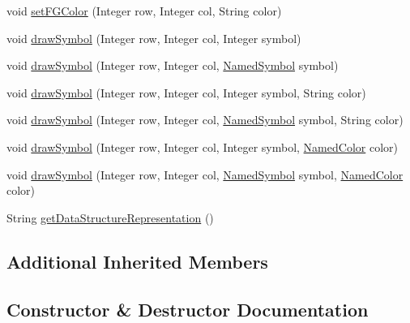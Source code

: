 \begin{DoxyCompactItemize}
\item 
void \mbox{\hyperlink{classbridges_1_1base_1_1_game_grid_a860f2669ba46bc7691f4bb5c7adf907b}{set\+F\+G\+Color}} (Integer row, Integer col, String color)
\item 
void \mbox{\hyperlink{classbridges_1_1base_1_1_game_grid_a8eee4918e2cbfc956a92a39252590114}{draw\+Symbol}} (Integer row, Integer col, Integer symbol)
\item 
void \mbox{\hyperlink{classbridges_1_1base_1_1_game_grid_a8e8f99d386149e9cd888dd9e6796e5e0}{draw\+Symbol}} (Integer row, Integer col, \mbox{\hyperlink{enumbridges_1_1base_1_1_named_symbol}{Named\+Symbol}} symbol)
\item 
void \mbox{\hyperlink{classbridges_1_1base_1_1_game_grid_a89a27cff9fd390f6d824b7e71534b256}{draw\+Symbol}} (Integer row, Integer col, Integer symbol, String color)
\item 
void \mbox{\hyperlink{classbridges_1_1base_1_1_game_grid_a998fd9e2a9a64e290c9edb01d49f324a}{draw\+Symbol}} (Integer row, Integer col, \mbox{\hyperlink{enumbridges_1_1base_1_1_named_symbol}{Named\+Symbol}} symbol, String color)
\item 
void \mbox{\hyperlink{classbridges_1_1base_1_1_game_grid_ad791794e65de113d96dbd173b34ae820}{draw\+Symbol}} (Integer row, Integer col, Integer symbol, \mbox{\hyperlink{enumbridges_1_1base_1_1_named_color}{Named\+Color}} color)
\item 
void \mbox{\hyperlink{classbridges_1_1base_1_1_game_grid_a778e5b036a18278c9e93e01faa19421c}{draw\+Symbol}} (Integer row, Integer col, \mbox{\hyperlink{enumbridges_1_1base_1_1_named_symbol}{Named\+Symbol}} symbol, \mbox{\hyperlink{enumbridges_1_1base_1_1_named_color}{Named\+Color}} color)
\item 
String \mbox{\hyperlink{classbridges_1_1base_1_1_game_grid_a3c72c7277f9c72ceff82fd063298541e}{get\+Data\+Structure\+Representation}} ()
\end{DoxyCompactItemize}
\subsection*{Additional Inherited Members}


\subsection{Constructor \& Destructor Documentation}
\mbox{\label{classbridges_1_1base_1_1_game_grid_a0b5330e66b504eddc00617c5f1fa6240}} 
